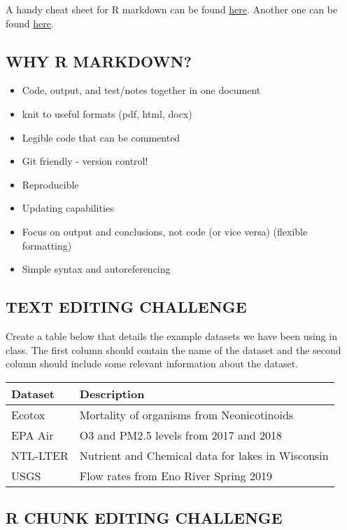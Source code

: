 \documentclass[]{article}
\providecommand{\tightlist}{%
  \setlength{\itemsep}{0pt}\setlength{\parskip}{0pt}}
\begin{document}
A handy cheat sheet for R markdown can be found
\href{https://www.rstudio.com/wp-content/uploads/2015/03/rmarkdown-reference.pdf}{here}.
Another one can be found
\href{https://www.rstudio.com/wp-content/uploads/2015/02/rmarkdown-cheatsheet.pdf}{here}.

\subsection{WHY R MARKDOWN?}\label{why-r-markdown}

\begin{itemize}
\tightlist
\item
  Code, output, and test/notes together in one document
\item
  knit to useful formats (pdf, html, docx)
\item
  Legible code that can be commented
\item
  Git friendly - version control!
\item
  Reproducible
\item
  Updating capabilities
\item
  Focus on output and conclusions, not code (or vice versa) (flexible
  formatting)
\item
  Simple syntax and autoreferencing
\end{itemize}

\subsection{TEXT EDITING CHALLENGE}\label{text-editing-challenge}

Create a table below that details the example datasets we have been
using in class. The first column should contain the name of the dataset
and the second column should include some relevant information about the
dataset.

\begin{longtable}[]{@{}ll@{}}
\toprule
Dataset & Description\tabularnewline
\midrule
\endhead
Ecotox & Mortality of organisms from Neonicotinoids\tabularnewline
EPA Air & O3 and PM2.5 levels from 2017 and 2018\tabularnewline
NTL-LTER & Nutrient and Chemical data for lakes in
Wisconsin\tabularnewline
USGS & Flow rates from Eno River Spring 2019\tabularnewline
\bottomrule
\end{longtable}

\subsection{R CHUNK EDITING CHALLENGE}\label{r-chunk-editing-challenge}
\end{document}
